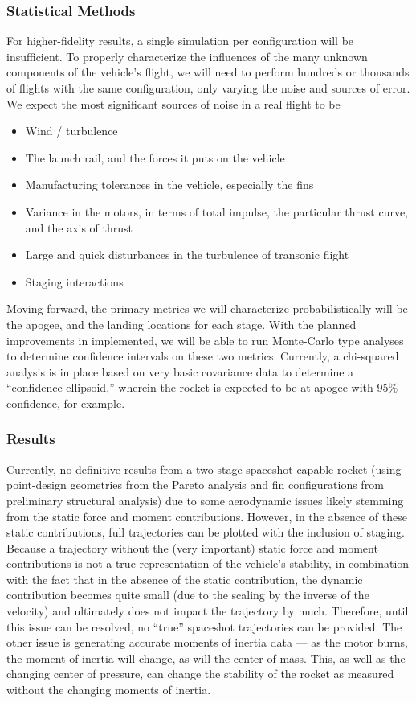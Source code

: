 \subsubsection{Statistical Methods}
For higher-fidelity results, a single simulation per configuration will be insufficient. To properly characterize the influences of the many unknown components of the vehicle’s flight, we will need to perform hundreds or thousands of flights with the same configuration, only varying the noise and sources of error. We expect the most significant sources of noise in a real flight to be

\begin{itemize}
    \item Wind / turbulence
    \item The launch rail, and the forces it puts on the vehicle
    \item Manufacturing tolerances in the vehicle, especially the fins
    \item Variance in the motors, in terms of total impulse, the particular thrust curve, and the axis of thrust
    \item Large and quick disturbances in the turbulence of transonic flight
    \item Staging interactions
\end{itemize}

Moving forward, the primary metrics we will characterize probabilistically will be the apogee, and the landing locations for each stage. With the planned improvements in  implemented, we will be able to run Monte-Carlo type analyses to determine confidence intervals on these two metrics. Currently, a chi-squared analysis is in place based on very basic covariance data to determine a ``confidence ellipsoid,'' wherein the rocket is expected to be at apogee with 95\% confidence, for example. 

\subsubsection{Results}
Currently, no definitive results from a two-stage spaceshot capable rocket (using point-design geometries from the Pareto analysis and fin configurations from preliminary structural analysis) due to some aerodynamic issues likely stemming from the static force and moment contributions. However, in the absence of these static contributions, full trajectories can be plotted with the inclusion of staging. Because a trajectory without the (very important) static force and moment contributions is not a true representation of the vehicle’s stability, in combination with the fact that in the absence of the static contribution, the dynamic contribution becomes quite small (due to the scaling by the inverse of the velocity) and ultimately does not impact the trajectory by much. Therefore, until this issue can be resolved, no ``true'' spaceshot trajectories can be provided. The other issue is generating accurate moments of inertia data --- as the motor burns, the moment of inertia will change, as will the center of mass. This, as well as the changing center of pressure, can change the stability of the rocket as measured without the changing moments of inertia.

